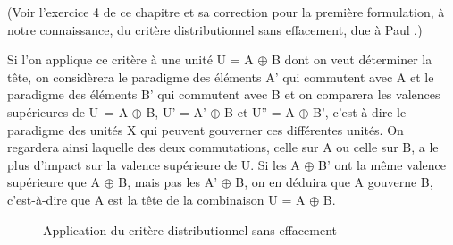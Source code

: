\noindent (Voir l’exercice 4 de ce chapitre et sa correction pour la première formulation, à notre connaissance, du critère distributionnel sans effacement, due à Paul \citealt{garde1977ordre}.) 

Si l’on applique ce critère à une unité U = A ${\oplus}$ B dont on veut déterminer la tête, on considèrera le paradigme des éléments A’ qui commutent avec A et le paradigme des éléments B’ qui commutent avec B et on comparera les valences supérieures de U~= A ${\oplus}$ B, U’ = A’ ${\oplus}$ B et U” = A ${\oplus}$ B’, c’est-à-dire le paradigme des unités X qui peuvent gouverner ces différentes unités.
On regardera ainsi laquelle des deux commutations, celle sur A ou celle sur B, a le plus d’impact sur la valence supérieure de U. Si les A ${\oplus}$ B’ ont la même valence supérieure que A ${\oplus}$ B, mais pas les A’ ${\oplus}$ B, on en déduira que A gouverne B, c’est-à-dire que A est la tête de la combinaison U = A ${\oplus}$ B.

\begin{figure}
\caption{Application du critère distributionnel sans effacement}
\begin{minipage}{.33\textwidth}\centering
\end{minipage}\begin{minipage}{.33\textwidth}\centering
\end{minipage}\begin{minipage}{.33\textwidth}\centering
\end{minipage}
\end{figure}

